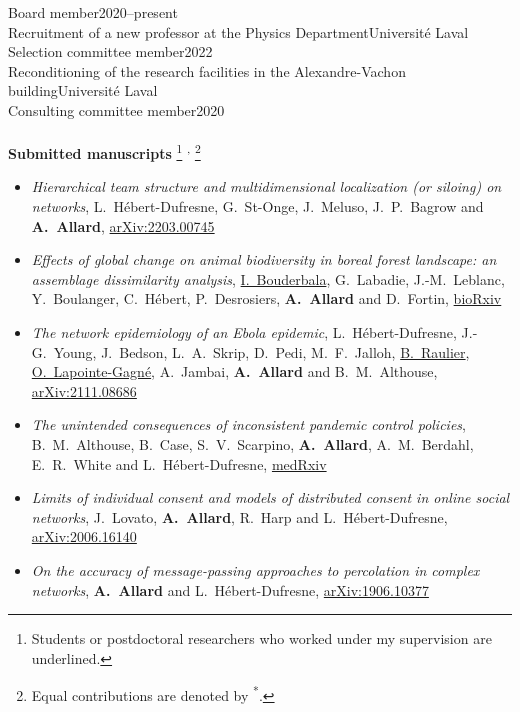 \documentclass[11pt]{article}
\newcommand{\TitreSection}[1]{\colorbox{background}{\makebox[\textwidth-0.5em][c]{\Large\textrm{\textsc{#1}}}}\vspace{0.75\baselineskip}\\}
\begin{document}
Board member\hfill 2020--present \vspace{0.75\baselineskip} \\
%
Recruitment of a new professor at the Physics Department\hfill Universit\'e Laval\\
Selection committee member\hfill 2022 \vspace{0.75\baselineskip} \\
%
Reconditioning of the research facilities in the Alexandre-Vachon building\hfill Universit\'e Laval\\
Consulting committee member\hfill 2020  \vspace{1.75\baselineskip} \\
%
%
%
%
%
\TitreSection{Publications and Presentations}
%
\textbf{Submitted manuscripts}%
%
\footnote{Students or postdoctoral researchers who worked under my supervision are underlined.}%
\textsuperscript{,}%
\footnote{Equal contributions are denoted by \textsuperscript{*}.}
%
\begin{itemize}[itemsep=0.5em]
%
  \item \textit{Hierarchical team structure and multidimensional localization (or siloing) on networks}, L.~Hébert-Dufresne, G.~St-Onge, J.~Meluso, J.~P.~Bagrow and \textbf{A.~Allard}, \href{https://arxiv.org/abs/2203.00745}{arXiv:2203.00745}
%
  \item \textit{Effects of global change on animal biodiversity in boreal forest landscape: an assemblage dissimilarity analysis}, \uline{I.~Bouderbala}, G.~Labadie, J.-M.~Leblanc, Y.~Boulanger, C.~Hébert, P.~Desrosiers, \textbf{A.~Allard} and D.~Fortin, \href{https://doi.org/10.1101/2022.01.31.477297}{bioRxiv}
%
  \item \textit{The network epidemiology of an Ebola epidemic}, L.~Hébert-Dufresne, J.-G.~Young, J.~Bedson, L.~A.~Skrip, D.~Pedi, M.~F.~Jalloh, \uline{B.~Raulier}, \uline{O.~Lapointe-Gagné}, A.~Jambai, \textbf{A.~Allard} and B.~M.~Althouse, \href{https://arxiv.org/abs/2111.08686}{arXiv:2111.08686}
%
  \item \textit{The unintended consequences of inconsistent pandemic control policies}, B.~M.~Althouse, B.~Case, S.~V.~Scarpino, \textbf{A.~Allard}, A.~M.~Berdahl, E.~R.~White and L.~Hébert-Dufresne, \href{https://doi.org/10.1101/2020.08.21.20179473}{medRxiv}
%
  \item \textit{Limits of individual consent and models of distributed consent in online social networks}, J.~Lovato, \textbf{A.~Allard}, R.~Harp and L.~H\'ebert-Dufresne, \href{https://arxiv.org/abs/2006.16140}{arXiv:2006.16140}
%
  \item \textit{On the accuracy of message-passing approaches to percolation in complex networks}, \textbf{A.~Allard} and L.~H\'ebert-Dufresne, \href{https://arxiv.org/abs/1906.10377}{arXiv:1906.10377}
%
\end{itemize}
\end{document}

